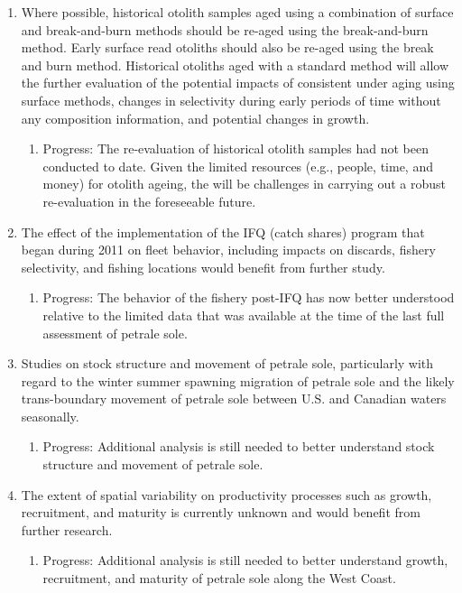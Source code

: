 \documentclass[12pt,]{article}
\begin{document}
\begin{enumerate}
\item Where possible, historical otolith samples aged using a combination of surface and break-and-burn methods should be re-aged using the break-and-burn method. Early surface read otoliths should also be re-aged using the break and burn method. Historical otoliths aged with a standard method will allow the further evaluation of the potential impacts of consistent under aging using surface methods, changes in selectivity during early periods of time without any composition information, and potential changes in growth.

\begin{enumerate}
\item Progress: The re-evaluation of historical otolith samples had not been conducted to date.  Given the limited resources (e.g., people, time, and money) for otolith ageing, the will be challenges in carrying out a robust re-evaluation in the foreseeable future.
\end{enumerate}

\item The effect of the implementation of the IFQ (catch shares) program that began during 2011 on fleet behavior, including impacts on discards, fishery selectivity, and fishing locations would benefit from further study.

\begin{enumerate}
\item Progress: The behavior of the fishery post-IFQ has now better understood relative to the limited data that was available at the time of the last full assessment of petrale sole.
\end{enumerate}

\item Studies on stock structure and movement of petrale sole, particularly with regard to the winter summer spawning migration of petrale sole and the likely trans-boundary movement of petrale sole between U.S. and Canadian waters seasonally.

\begin{enumerate}
\item Progress: Additional analysis is still needed to better understand stock structure and movement of petrale sole.
\end{enumerate}

\item The extent of spatial variability on productivity processes such as growth, recruitment, and maturity is currently unknown and would benefit from further research.

\begin{enumerate}
\item Progress: Additional analysis is still needed to better understand growth, recruitment, and maturity of petrale sole along the West Coast.
\end{enumerate}

\end{enumerate}
\end{document}

